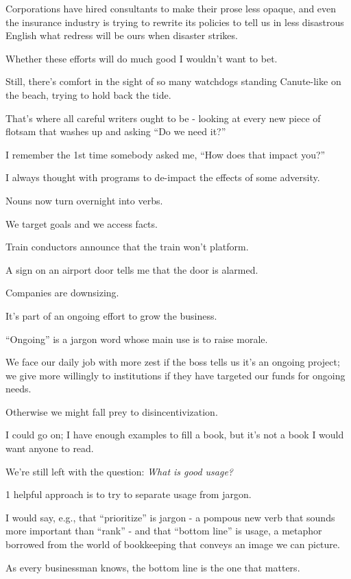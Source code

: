 \documentclass{book}
\numberwithin{equation}{section}
\begin{document}
Corporations have hired consultants to make their prose less opaque, and even the insurance industry is trying to rewrite its policies to tell us in less disastrous English what redress will be ours when disaster strikes.

Whether these efforts will do much good I wouldn't want to bet.

Still, there's comfort in the sight of so many watchdogs standing Canute-like on the beach, trying to hold back the tide.

That's where all careful writers ought to be - looking at every new piece of flotsam that washes up and asking ``Do we need it?''

%
I remember the 1st time somebody asked me, ``How does that impact you?''

I always thought with programs to de-impact the effects of some adversity.

Nouns now turn overnight into verbs.

We target goals and we access facts.

Train conductors announce that the train won't platform.

A sign on an airport door tells me that the door is alarmed.

Companies are downsizing.

It's part of an ongoing effort to grow the business.

``Ongoing'' is a jargon word whose main use is to raise morale.

We face our daily job with more zest if the boss tells us it's an ongoing project; we give more willingly to institutions if they have targeted our funds for ongoing needs.

Otherwise we might fall prey to disincentivization.

%
I could go on; I have enough examples to fill a book, but it's not a book I would want anyone to read.

We're still left with the question: \textit{What is good usage?}

1 helpful approach is to try to separate usage from jargon.

%
I would say, e.g., that ``prioritize'' is jargon - a pompous new verb that sounds more important than ``rank'' - and that ``bottom line'' is usage, a metaphor borrowed from the world of bookkeeping that conveys an image we can picture.

As every businessman knows, the bottom line is the one that matters.
\end{document}
